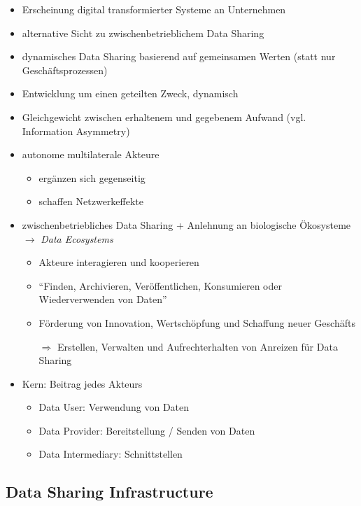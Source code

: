 \begin{itemize}
    \item Erscheinung digital transformierter Systeme an Unternehmen
    \item alternative Sicht zu zwischenbetrieblichem Data Sharing
    \item dynamisches Data Sharing basierend auf gemeinsamen Werten (statt nur Geschäftsprozessen)
    \item Entwicklung um einen geteilten Zweck, dynamisch
    \item Gleichgewicht zwischen erhaltenem und gegebenem Aufwand (vgl. Information Asymmetry)
    \item autonome multilaterale Akteure
    \begin{itemize}
        \item ergänzen sich gegenseitig
        \item schaffen Netzwerkeffekte
    \end{itemize}
    \item zwischenbetriebliches Data Sharing + Anlehnung an biologische Ökosysteme $\to$ \emph{Data Ecosystems}
    \begin{itemize}
        \item Akteure interagieren und kooperieren
        \item \enquote{Finden, Archivieren, Veröffentlichen, Konsumieren oder Wiederverwenden von Daten}
        \item Förderung von Innovation, Wertschöpfung und Schaffung neuer Geschäfts
        \item[$\Rightarrow$] Erstellen, Verwalten und Aufrechterhalten von Anreizen für Data Sharing
    \end{itemize}
    \item Kern: Beitrag jedes Akteurs
    \begin{itemize}
        \item Data User: Verwendung von Daten
        \item Data Provider: Bereitstellung / Senden von Daten
        \item Data Intermediary: Schnittstellen~\cite{mollerIndustrialDataEcosystems2024}
    \end{itemize}
\end{itemize}


\subsection{Data Sharing Infrastructure}

